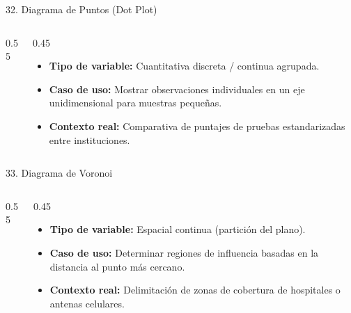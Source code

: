 \documentclass[aspectratio=169,10pt]{beamer}
\begin{document}
\begin{frame}{32. Diagrama de Puntos (Dot Plot)}
\begin{columns}
\begin{column}{0.55\textwidth}
\end{column}
\begin{column}{0.45\textwidth}
\begin{itemize}\small
\item \textbf{Tipo de variable:} Cuantitativa discreta / continua agrupada.
\item \textbf{Caso de uso:} Mostrar observaciones individuales en un eje unidimensional para muestras pequeñas.
\item \textbf{Contexto real:} Comparativa de puntajes de pruebas estandarizadas entre instituciones.
\end{itemize}
\end{column}
\end{columns}
\end{frame}

\begin{frame}{33. Diagrama de Voronoi}
\begin{columns}
\begin{column}{0.55\textwidth}
\end{column}
\begin{column}{0.45\textwidth}
\begin{itemize}\small
\item \textbf{Tipo de variable:} Espacial continua (partición del plano).
\item \textbf{Caso de uso:} Determinar regiones de influencia basadas en la distancia al punto más cercano.
\item \textbf{Contexto real:} Delimitación de zonas de cobertura de hospitales o antenas celulares.
\end{itemize}
\end{column}
\end{columns}
\end{frame}
\end{document}
